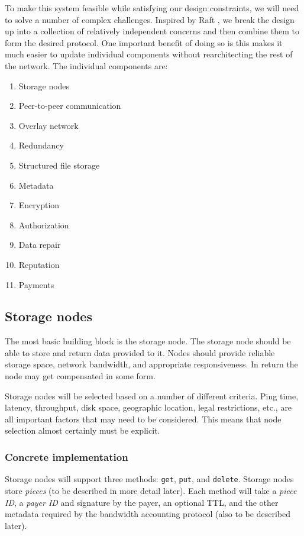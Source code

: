 \documentclass[a4paper,10pt]{article}
\newcommand{\code}[1]{{\tt #1}}
\begin{document}
To make this system feasible while satisfying our design constraints, we will
need to solve a number of complex challenges. Inspired by Raft \cite{raft}, we
break the design up into a collection of relatively independent concerns
and then combine them to form the desired protocol. 
One important benefit of doing so is this makes it much easier to
update individual components without rearchitecting the rest of the
network. The individual components are:

\begin{enumerate}
\item Storage nodes
\item Peer-to-peer communication
\item Overlay network
\item Redundancy
\item Structured file storage
\item Metadata
\item Encryption
\item Authorization
\item Data repair
\item Reputation
\item Payments
\end{enumerate}

\subsection{Storage nodes}

The most basic building block is the storage node. The storage node should be
able to store and return data provided to it. Nodes should provide reliable
storage space, network bandwidth, and appropriate responsiveness. In return the
node may get compensated in some form.

Storage nodes will be selected based on a number of different criteria.
Ping time, latency, throughput, disk space, geographic location, legal
restrictions, etc., are all important factors that may need to be considered.
This means that node selection almost certainly must be explicit.

\subsubsection{Concrete implementation}

Storage nodes will support three methods: \code{get}, \code{put}, and
\code{delete}.
Storage nodes store {\em pieces} (to be described in more detail later).
Each method will take
  a {\em piece ID},
  a {\em payer ID} and signature by the payer,
  an optional TTL,
  and the other metadata required by the bandwidth accounting protocol (also
    to be described later).
\end{document}
